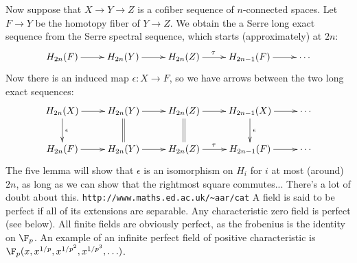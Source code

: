 \documentclass[11pt]{article}
\begin{document}
Now suppose that $X\to Y\to Z$ is a cofiber sequence of $n$-connected spaces. Let $F\to Y$ be the homotopy fiber of $Y\to Z$.  We obtain the a Serre long exact sequence from the Serre spectral sequence, which starts (approximately) at $2n$:
\[\xymatrix{
H_{2n}(F)\ar[r]&H_{2n}(Y)\ar[r]&H_{2n}(Z)\ar[r]^{\tau\ \ }&H_{2n-1}(F)\ar[r]&\cdots
}\]
Now there is an induced map $\epsilon:X\to F$, so we have arrows between the two long exact sequences:
\[\xymatrix{
H_{2n}(X)\ar[r]\ar[d]^\epsilon&H_{2n}(Y)\ar[r]\ar@{=}[d]&H_{2n}(Z)\ar[r]^{\ \ }\ar@{=}[d]&H_{2n-1}(X)\ar[r]\ar[d]^\epsilon&\cdots\\
H_{2n}(F)\ar[r]&H_{2n}(Y)\ar[r]&H_{2n}(Z)\ar[r]^{\tau\ \ }&H_{2n-1}(F)\ar[r]&\cdots
}\]
The five lemma will show that $\epsilon$ is an isomorphism on $H_{i}$ for $i$ at most (around) $2n$, as long as we can show that the rightmost square commutes...
There's a lot of doubt about this.
\verb|http://www.maths.ed.ac.uk/~aar/cat|
A field is said to be perfect if all of its extensions are separable. Any
characteristic zero field is perfect (see below). All finite fields are
obviously perfect, as the frobenius is the identity on $\F_p$. An example of an
infinite perfect field of positive characteristic is
$\F_p(x,x^{1/p},x^{1/p^2},x^{1/p^3},\ldots)$.
\end{document}
